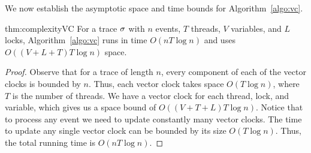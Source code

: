 We now establish the asymptotic space and time bounds for
Algorithm~\ref{algo:vc}.

\begin{reptheorem}{thm:complexityVC}
For a trace $\sigma$ with $n$ events, $T$ threads, $V$ variables, and $L$
locks, Algorithm~\ref{algo:vc} runs in time $O(nT\log n)$ and uses
$O((V+L+T)T\log n)$ space.
\end{reptheorem}

\begin{proof}
Observe that for a trace of length $n$, every component of each of the
vector clocks is bounded by $n$. Thus, each vector clock takes space
$O(T\log n)$, where $T$ is the number of threads. We have a vector
clock for each thread, lock, and variable, which gives us a space
bound of $O((V+T+L)T\log n)$. Notice that to process any event we need
to update constantly many vector clocks. The time to update any single
vector clock can be bounded by its size $O(T\log n)$. Thus, the total
running time is $O(nT\log n)$.
\end{proof}




